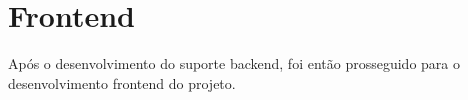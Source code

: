 \section{Frontend}
Após o desenvolvimento do suporte backend, foi então prosseguido para o desenvolvimento frontend do projeto.




\newpage



\newpage







\newpage









\newpage

